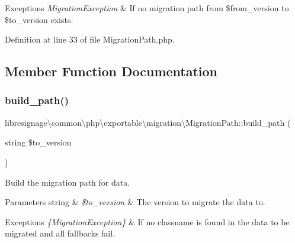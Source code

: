 \begin{DoxyExceptions}{Exceptions}
{\em Migration\+Exception} & If no migration path from \$from\+\_\+version to \$to\+\_\+version exists. \\
\hline
\end{DoxyExceptions}


Definition at line 33 of file Migration\+Path.\+php.



\subsection{Member Function Documentation}
\mbox{\label{classlibresignage_1_1common_1_1php_1_1exportable_1_1migration_1_1MigrationPath_a76ac19893ba153e3c8feb45b8f544095}} 
\subsubsection{\texorpdfstring{build\+\_\+path()}{build\_path()}}
{\footnotesize\ttfamily libresignage\textbackslash{}common\textbackslash{}php\textbackslash{}exportable\textbackslash{}migration\textbackslash{}\+Migration\+Path\+::build\+\_\+path (\begin{DoxyParamCaption}\item[{string}]{\$to\+\_\+version }\end{DoxyParamCaption})}

Build the migration path for data.


\begin{DoxyParams}[1]{Parameters}
string & {\em \$to\+\_\+version} & The version to migrate the data to.\\
\hline
\end{DoxyParams}

\begin{DoxyExceptions}{Exceptions}
{\em \{\+Migration\+Exception\}} & If no classname is found in the data to be migrated and all fallbacks fail. \\
\hline
\end{DoxyExceptions}


